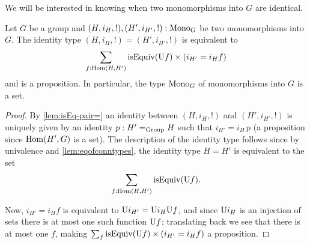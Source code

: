We will be interested in knowing when two monomorphisms into $G$ are identical.

\begin{lemma}
  \label{lem:setofsubgroups}
  Let $G$ be a group and $(H,i_H,!),(H',i_{H'},!):\mathrm{Mono}_G$ be two monomorphisms into $G$.  The identity type $(H,i_H,!)=(H',i_{H'},!)$ is equivalent to
  $$\sum_{f:\Hom(H,H')}\isEq(\US f)\times (i_{H'}=i_H f)$$ and is a proposition.
  In particular, the type $\mathrm{Mono}_G$ of monomorphisms into $G$ is a set.
\end{lemma}
\begin{proof}
By \cref{lem:isEq-pair=} an identity between $(H,i_H,!)$ and $(H',i_{H'},!)$ is uniquely given by an identity $p:H'=_{\mathrm{Group}}H$ such that $i_{H'}=i_H\,p$ (a proposition since $\Hom(H',G)$ is a set).
  The description of the identity type follows since by univalence and \cref{lem:eqofconntypes}, the identity type $H=H'$ is equivalent to the set 
$$\sum_{f:\Hom(H,H')}\isEq(\US f).$$  

Now, $i_{H'}=i_Hf$ is equivalent to $\mathrm{U} i_{H'}=\mathrm{U} i_H \mathrm{U} f$, and since $\mathrm{U} i_H$ is an injection of sets there is at most one such function $\mathrm{U} f$; translating back we see that there is at most one $f$, making $\sum_{f%
}\isEq(\US f)\times (i_{H'}=i_H f)$ a proposition.  
\end{proof}

